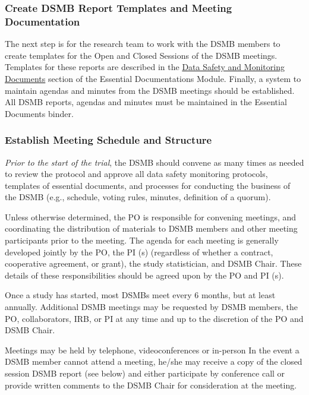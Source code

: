 \documentclass[]{book}
\theoremstyle{definition}
\theoremstyle{definition}
\theoremstyle{definition}
\theoremstyle{remark}
\begin{document}
\subsubsection{Create DSMB Report Templates and Meeting
Documentation}\label{create-dsmb-report-templates-and-meeting-documentation}

The next step is for the research team to work with the DSMB members to
create templates for the Open and Closed Sessions of the DSMB meetings.
Templates for these reports are described in the
\href{https://ifar-isac.github.io/book/essential-documentations.html\#data-safety-and-monitoring-documents}{Data
Safety and Monitoring Documents} section of the Essential Documentations
Module. Finally, a system to maintain agendas and minutes from the DSMB
meetings should be established. All DSMB reports, agendas and minutes
must be maintained in the Essential Documents binder.

\subsubsection{Establish Meeting Schedule and
Structure}\label{establish-meeting-schedule-and-structure}

\emph{Prior to the start of the trial}, the DSMB should convene as many
times as needed to review the protocol and approve all data safety
monitoring protocols, templates of essential documents, and processes
for conducting the business of the DSMB (e.g., schedule, voting rules,
minutes, definition of a quorum).

Unless otherwise determined, the PO is responsible for convening
meetings, and coordinating the distribution of materials to DSMB members
and other meeting participants prior to the meeting. The agenda for each
meeting is generally developed jointly by the PO, the PI (s) (regardless
of whether a contract, cooperative agreement, or grant), the study
statistician, and DSMB Chair. These details of these responsibilities
should be agreed upon by the PO and PI (s).

Once a study has started, most DSMBs meet every 6 months, but at least
annually. Additional DSMB meetings may be requested by DSMB members, the
PO, collaborators, IRB, or PI at any time and up to the discretion of
the PO and DSMB Chair.

Meetings may be held by telephone, videoconferences or in-person In the
event a DSMB member cannot attend a meeting, he/she may receive a copy
of the closed session DSMB report (see below) and either participate by
conference call or provide written comments to the DSMB Chair for
consideration at the meeting.
\end{document}
